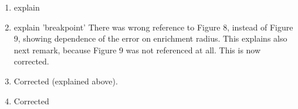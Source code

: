 \documentclass[a4paper,11pt]{article}
\begin{document}
\begin{enumerate}
\item explain%

\item explain 'breakpoint'
      There was wrong reference to Figure 8, instead of Figure 9, showing dependence of the error on enrichment radius. %
      This explains also next remark, because Figure 9 was not referenced at all.
      This is now corrected. %
\item Corrected (explained above). %
\item Corrected %

\end{enumerate} 
\end{document}
